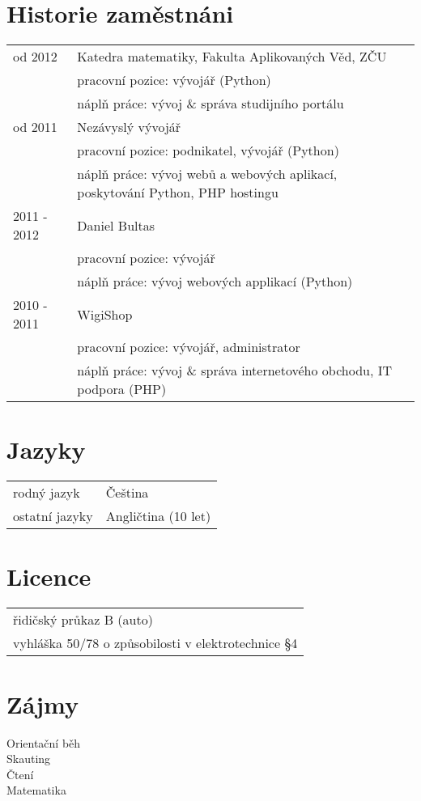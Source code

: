 \documentclass[12pt,a4paper]{article}
\begin{document}
\section*{Historie zaměstnáni}
\begin{tabular}{@{}p{2cm}l}
od 2012  & Katedra matematiky, Fakulta Aplikovaných Věd, ZČU \\
 & pracovní pozice: vývojář (Python)\\
 & náplň práce: vývoj \& správa studijního portálu\\
od 2011 & Nezávyslý vývojář \\
 & pracovní pozice: podnikatel, vývojář (Python)\\
 & náplň práce: vývoj webů a webových aplikací, poskytování Python, PHP hostingu\\ 
2011 - 2012 & Daniel Bultas\\
 & pracovní pozice: vývojář\\
 & náplň práce: vývoj webových applikací (Python)\\
2010 - 2011 & WigiShop\\
 & pracovní pozice: vývojář, administrator\\
 & náplň práce: vývoj \& správa internetového obchodu, IT podpora (PHP)\\
\end{tabular}

\section*{Jazyky}
\begin{tabular}{@{}p{4cm}l}
rodný jazyk & Čeština\\
ostatní jazyky & Angličtina (10 let)\\
\end{tabular}

\section*{Licence}
\begin{tabular}{@{}l}
řidičský průkaz B (auto)\\
vyhláška 50/78 o způsobilosti v elektrotechnice §4\\
\end{tabular}

\section*{Zájmy}
Orientační běh\\
Skauting\\
Čtení\\
Matematika\\
\end{document}
